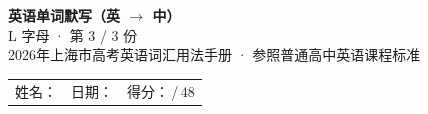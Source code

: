 \documentclass[10pt,a4paper]{article}
\begin{document}
\pagestyle{plain}

\begin{center}
{\LARGE\bfseries 英语单词默写（英 $\to$ 中）}\\[0.22em]
{\large L 字母 · 第 3 / 3 份}\\[0.18em]
{\small 2026年上海市高考英语词汇用法手册 · 参照普通高中英语课程标准}
\end{center}

\vspace{0.25em}
\noindent\begin{tabular}{@{}p{}@{}p{}@{}p{}@{}}
姓名：\underline{\hspace{2.0cm}} & 日期：\underline{\hspace{2.0cm}} & 得分：\underline{\hspace{1.3cm}}\,/\,48 \\
\end{tabular}

\vspace{0.3em}

\vspace{0.08em}
\end{document}
